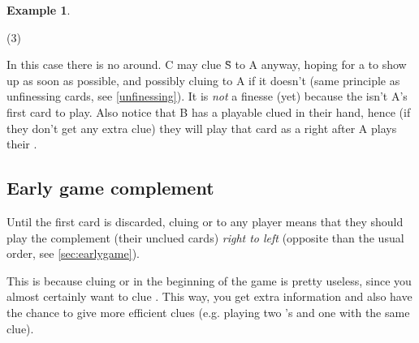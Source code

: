 \documentclass[a4paper]{article}
\theoremstyle{plain}
\theoremstyle{definition}
\newtheorem{example}[theorem]{Example}
\begin{document}
%	

\begin{example}
	\hfill
	\begin{tasks}(3)
		\task[+]      
		\task[A]    
		\task[B]    
		\task[C]    
		\task[D]    
		\task[E]    
	\end{tasks}
	
	In this case there is no  around. C may clue \G{S} to A anyway, hoping for a  to show up as soon as possible, and possibly cluing  to A if it doesn't (same principle as unfinessing cards, see \ref{unfinessing}). It is \textit{not} a finesse (yet) because the  isn't A's first card to play. Also notice that B has a playable clued  in their hand, hence (if they don't get any extra clue) they will play that card as a  right after A plays their .
\end{example}

\subsection{Early game complement}
\label{firstroundcomplement}

Until the first card is discarded, cluing  or  to any player means that they should play the complement (their unclued cards) \textit{right to left} (opposite than the usual order, see \ref{sec:earlygame}).

This is because cluing  or  in the beginning of the game is pretty useless, since you almost certainly want to clue . This way, you get extra information and also have the chance to give more efficient clues (e.g. playing two 's and one  with the same clue).
\end{document}
